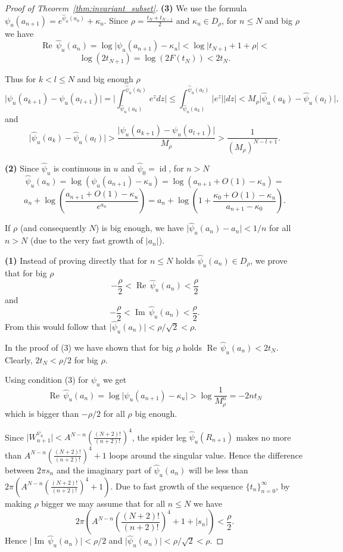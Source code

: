 \documentclass[10pt,reqno,a4paper]{amsart}
\numberwithin{figure}{section}
\numberwithin{equation}{section}
\newcommand{\id}{\operatorname{id}}
\renewcommand{\Re}{\operatorname{Re\,}}
\renewcommand{\Im}{\operatorname{Im\,}}
\newcommand{\abs}[1]{\lvert #1 \rvert}
\begin{document}
\begin{proof}[Proof of Theorem~\ref{thm:invariant_subset}]
	\textbf{(3)} We use the formula $\psi_u(a_{n+1})=e^{\hat{\psi}_u(a_n)}+\kappa_u$. Since $\rho=\frac{t_N+t_{N-1}}{2}$ and $\kappa_u\in D_\rho$, for $n\leq N$ and big $\rho$ we have
	$$\Re \hat{\psi}_u(a_n)=\log\abs{\psi_u(a_{n+1})-\kappa_u}<\log\abs{t_{N+1}+1+\rho}<$$
	$$\log(2t_{N+1})=\log(2F(t_N))<2t_N.$$
	
	Thus for $k<l\leq N$ and big enough $\rho$ 
	$$\abs{\psi_u(a_{k+1})-\psi_u(a_{l+1})}=\abs{\int_{\hat{\psi}_u(a_k)}^{\hat{\psi}_u(a_l)}e^z dz}\leq\int_{\hat{\psi}_u(a_k)}^{\hat{\psi}_u(a_l)}\abs{e^z} \abs{dz}<M_\rho\abs{\hat{\psi}_u(a_k)-\hat{\psi}_u(a_l)},$$
	and
	$$\abs{\hat{\psi}_u(a_k)-\hat{\psi}_u(a_l)}>\frac{\abs{\psi_u(a_{k+1})-\psi_u(a_{l+1})}}{M_\rho}>\frac{1}{(M_\rho)^{N-l+1}}.$$
	
	\textbf{(2)} Since $\hat{\psi}_u$ is continuous in $u$ and $\hat{\psi}_0=\id$, for $n>N$
	$$\hat{\psi}_u(a_n)=\log(\psi_u(a_{n+1})-\kappa_u)=\log (a_{n+1}+O(1)-\kappa_u)=$$
	$$a_n+\log\left(\frac{a_{n+1}+O(1)-\kappa_u}{e^{a_n}}\right)=a_n+\log\left(1+\frac{\kappa_0+O(1)-\kappa_u}{a_{n+1}-\kappa_0}\right).$$
	
	If $\rho$ (and consequently $N$) is big enough, we have $\abs{\hat{\psi}_u(a_n)-a_n}<1/n$ for all $n>N$ (due to the very fast growth of $\abs{a_n}$).
	
	\textbf{(1)} Instead of proving directly that for $n\leq N$ holds $\hat{\psi}_u(a_n)\in D_\rho$, we prove that for big $\rho$
	$$-\frac{\rho}{2}<\Re\hat{\psi}_u(a_n)<\frac{\rho}{2}$$
	and
	$$-\frac{\rho}{2}<\Im\hat{\psi}_u(a_n)<\frac{\rho}{2}.$$
	From this would follow that $\abs{\hat{\psi}_u(a_n)}<\rho/{\sqrt{2}}<\rho.$
	
	In the proof of (3) we have shown that for big $\rho$ holds $\Re \hat{\psi}_u(a_n)<2t_N$. Clearly, $2t_N<\rho/2$ for big $\rho$.
	
	Using condition (3) for $\psi_u$ we get
	$$\Re \hat{\psi}_u(a_n)=\log\abs{\psi_u(a_{n+1})-\kappa_u}>\log\frac{1}{M_\rho^n}=-2nt_N$$
	which is bigger than $-\rho/2$ for all $\rho$ big enough.
	
	Since $\abs{W_{n+1}^{\psi_u}}<A^{N-n}\left(\frac{(N+2)!}{(n+2)!}\right)^4$, the spider leg $\hat{\psi}_u(R_{n+1})$ makes no more than $A^{N-n}\left(\frac{(N+2)!}{(n+2)!}\right)^4+1$ loops around the singular value. Hence the difference between $2\pi s_n$ and the imaginary part of $\hat{\psi}_u(a_n)$ will be less than $2\pi \left(A^{N-n}\left(\frac{(N+2)!}{(n+2)!}\right)^4+1\right)$. Due to fast growth of the sequence $\{t_n\}_{n=0}^\infty$, by making $\rho$ bigger we may assume that for all $n\leq N$ we have 
	$$2\pi \left(A^{N-n}\left(\frac{(N+2)!}{(n+2)!}\right)^4+1+\abs{s_n}\right)<\frac{\rho}{2}.$$
	Hence $\abs{\Im\hat{\psi}_u(a_n)}<\rho/2$ and $\abs{\hat{\psi}_u(a_n)}<\rho/\sqrt{2}<\rho$.	
\end{proof}
\end{document}
